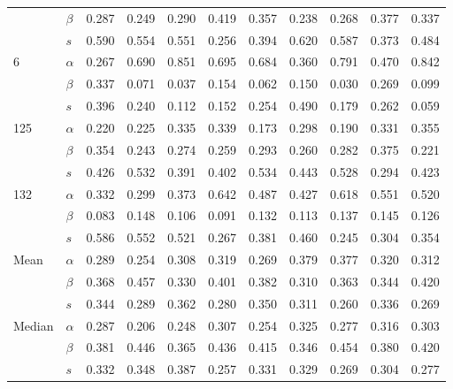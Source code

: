 \begin{longtable}{llrrrrrrrrr}
       & $\beta$ & 0.287 & 0.249 & 0.290 & 0.419 & 0.357 & 0.238 & 0.268 & 0.377 & 0.337 \\
       & $s$ & 0.590 & 0.554 & 0.551 & 0.256 & 0.394 & 0.620 & 0.587 & 0.373 & 0.484 \\
\cline{1-11}
\multirow{3}{*}{6} & $\alpha$ & 0.267 & 0.690 & 0.851 & 0.695 & 0.684 & 0.360 & 0.791 & 0.470 & 0.842 \\
       & $\beta$ & 0.337 & 0.071 & 0.037 & 0.154 & 0.062 & 0.150 & 0.030 & 0.269 & 0.099 \\
       & $s$ & 0.396 & 0.240 & 0.112 & 0.152 & 0.254 & 0.490 & 0.179 & 0.262 & 0.059 \\
\cline{1-11}
\multirow{3}{*}{125} & $\alpha$ & 0.220 & 0.225 & 0.335 & 0.339 & 0.173 & 0.298 & 0.190 & 0.331 & 0.355 \\
       & $\beta$ & 0.354 & 0.243 & 0.274 & 0.259 & 0.293 & 0.260 & 0.282 & 0.375 & 0.221 \\
       & $s$ & 0.426 & 0.532 & 0.391 & 0.402 & 0.534 & 0.443 & 0.528 & 0.294 & 0.423 \\
\cline{1-11}
\multirow{3}{*}{132} & $\alpha$ & 0.332 & 0.299 & 0.373 & 0.642 & 0.487 & 0.427 & 0.618 & 0.551 & 0.520 \\
       & $\beta$ & 0.083 & 0.148 & 0.106 & 0.091 & 0.132 & 0.113 & 0.137 & 0.145 & 0.126 \\
       & $s$ & 0.586 & 0.552 & 0.521 & 0.267 & 0.381 & 0.460 & 0.245 & 0.304 & 0.354 \\
\cline{1-11}
\multirow{3}{*}{Mean} & $\alpha$ & 0.289 & 0.254 & 0.308 & 0.319 & 0.269 & 0.379 & 0.377 & 0.320 & 0.312 \\
       & $\beta$ & 0.368 & 0.457 & 0.330 & 0.401 & 0.382 & 0.310 & 0.363 & 0.344 & 0.420 \\
       & $s$ & 0.344 & 0.289 & 0.362 & 0.280 & 0.350 & 0.311 & 0.260 & 0.336 & 0.269 \\
\cline{1-11}
\multirow{3}{*}{Median} & $\alpha$ & 0.287 & 0.206 & 0.248 & 0.307 & 0.254 & 0.325 & 0.277 & 0.316 & 0.303 \\
       & $\beta$ & 0.381 & 0.446 & 0.365 & 0.436 & 0.415 & 0.346 & 0.454 & 0.380 & 0.420 \\
       & $s$ & 0.332 & 0.348 & 0.387 & 0.257 & 0.331 & 0.329 & 0.269 & 0.304 & 0.277 \\
\end{longtable}
